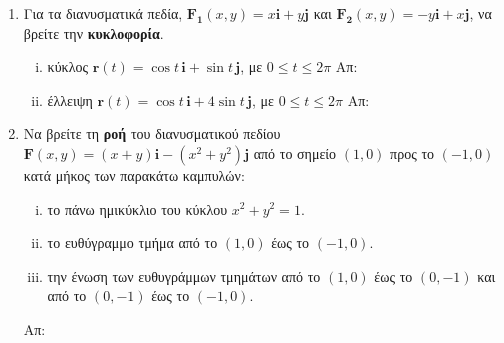 \begin{enumerate}
  \item Για τα διανυσματικά πεδία, 
    $ \mathbf{F_{1}}(x,y) = x \mathbf{i} + y \mathbf{j} $ και $ \mathbf{F_{2}}(x,y) = 
    -y\mathbf{i} + x \mathbf{j} $, να βρείτε την \textbf{κυκλοφορία}.
    \begin{enumerate}[i)]
      \item κύκλος $ \mathbf{r}(t)= \cos{t}\, \mathbf{i} + \sin{t}\, \mathbf{j}$, με 
        $ 0 \leq t \leq 2 \pi $ 
        \hfill Απ: 
      \item έλλειψη $ \mathbf{r}(t)= \cos{t}\, \mathbf{i} + 4\sin{t}\, \mathbf{j}$, με 
        $ 0 \leq t \leq 2 \pi $ 
        \hfill Απ:  
    \end{enumerate}

  \item Να βρείτε τη \textbf{ροή} του διανυσματικού πεδίου $ \mathbf{F}(x,y) = (x+y) 
    \mathbf{i} - (x^{2}+y^{2}) \mathbf{j} $ από το σημείο $ (1,0) $ προς το $ (-1,0) $ 
    κατά μήκος των παρακάτω καμπυλών:
    \begin{enumerate}[i)]
      \item το πάνω ημικύκλιο του κύκλου $ x^{2}+y^{2}=1 $.
      \item το ευθύγραμμο τμήμα από το $ (1,0) $ έως το $ (-1,0) $.
      \item την ένωση των ευθυγράμμων τμημάτων από το $ (1,0) $ έως το $ (0,-1) $ και 
        από το $ (0,-1) $ έως το $ (-1,0) $.
    \end{enumerate}
    \hfill Απ: 

\end{enumerate}







